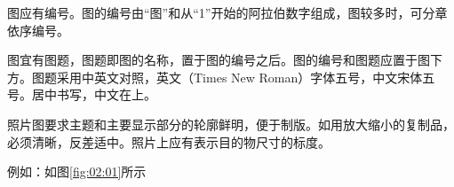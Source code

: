 图应有编号。图的编号由“图”和从“1”开始的阿拉伯数字组成，图较多时，可分章依序编号。

图宜有图题，图题即图的名称，置于图的编号之后。图的编号和图题应置于图下方。图题采用中英文对照，英文（Times New Roman）字体五号，中文宋体五号。居中书写，中文在上。

照片图要求主题和主要显示部分的轮廓鲜明，便于制版。如用放大缩小的复制品，必须清晰，反差适中。照片上应有表示目的物尺寸的标度。

例如：如图\ref{fig:02:01}所示
\begin{figure}[h]
	\setlength{\belowcaptionskip}{-0.2cm} 
	\centering
	\addtocounter{subfigure}{-1}

\end{figure}
